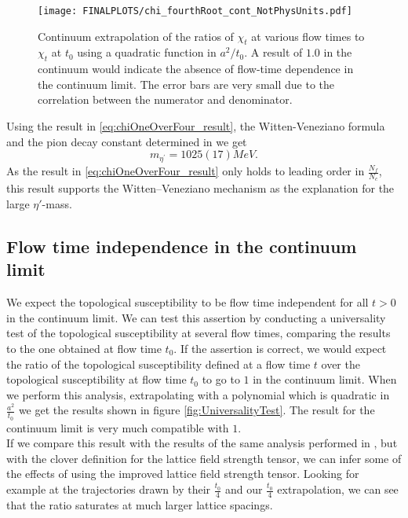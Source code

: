 \documentclass[a4paper,10pt]{book}
\begin{document}
\begin{figure}[htbp]
\centering
\texttt{[image: FINALPLOTS/chi\_fourthRoot\_cont\_NotPhysUnits.pdf]}
\caption[]{Continuum extrapolation of the ratios of $\chi_t$ at various flow times to $\chi_t$ at $t_0$ using a quadratic function in $a^2/t_0$. A result of $1.0$ in the continuum would indicate the absence of flow-time dependence in the continuum limit. The error bars are very small due to the correlation between the numerator and denominator.}\label{fig:chi1over4-non-physical-units}
\end{figure}
Using the result in \eqref{eq:chiOneOverFour_result}, the Witten-Veneziano formula and the pion decay constant determined in \cite{https://doi.org/10.48550/arxiv.0802.1043} we get
\begin{equation}
m_{\eta^{\prime}}=1025(17)MeV.
\end{equation}
As the result in \eqref{eq:chiOneOverFour_result} only holds to leading order in $\frac{N_f}{N_c}$, this result supports the Witten–Veneziano mechanism as the explanation for the large $\eta'$-mass.
\subsection{Flow time independence in the continuum limit}
We expect the topological susceptibility to be flow time independent for all $t>0$ in the continuum limit. We can test this assertion by conducting a universality test of the topological susceptibility at several flow times, comparing the results to the one obtained at flow time $t_0$. If the assertion is correct, we would expect the ratio of the topological susceptibility defined at a flow time $t$ over the topological susceptibility at flow time $t_0$ to go to $1$ in the continuum limit. When we perform this analysis, extrapolating with a polynomial which is quadratic in $\frac{a^2}{t_0}$ we get the results shown in figure \ref{fig:UniversalityTest}. The result for the continuum limit is very much compatible with $1$.\\If we compare this result with the results of the same analysis performed in \cite{non_gaussianities2015}, but with the clover definition for the lattice field strength tensor,  we can infer some of the effects of using the improved lattice field strength tensor. Looking for example at the trajectories drawn by their $\frac{t_0}{4}$ and our $\frac{t_0}{4}$ extrapolation, we can see that the ratio saturates at much larger lattice spacings.\\\\
\end{document}

